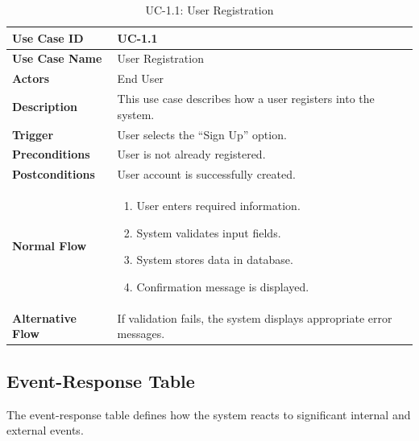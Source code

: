 \begin{table}[h]
\centering
\caption{UC-1.1: User Registration}

\begin{tabularx}{\textwidth}{
|>{\raggedright\arraybackslash}p{3.5cm}
|>{\raggedright\arraybackslash}X|}

\hline
\textbf{Use Case ID} & UC-1.1 \\ \hline
\textbf{Use Case Name} & User Registration \\ \hline
\textbf{Actors} & End User \\ \hline
\textbf{Description} & This use case describes how a user registers into the system. \\ \hline
\textbf{Trigger} & User selects the ``Sign Up'' option. \\ \hline
\textbf{Preconditions} & User is not already registered. \\ \hline
\textbf{Postconditions} & User account is successfully created. \\ \hline
\textbf{Normal Flow} &
\begin{enumerate}
    \item User enters required information.
    \item System validates input fields.
    \item System stores data in database.
    \item Confirmation message is displayed.
\end{enumerate}
\\ \hline
\textbf{Alternative Flow} &
If validation fails, the system displays appropriate error messages.
\\ \hline

\end{tabularx}

\end{table}


\subsection{Event-Response Table}

The event-response table defines how the system reacts to significant internal and external events.

